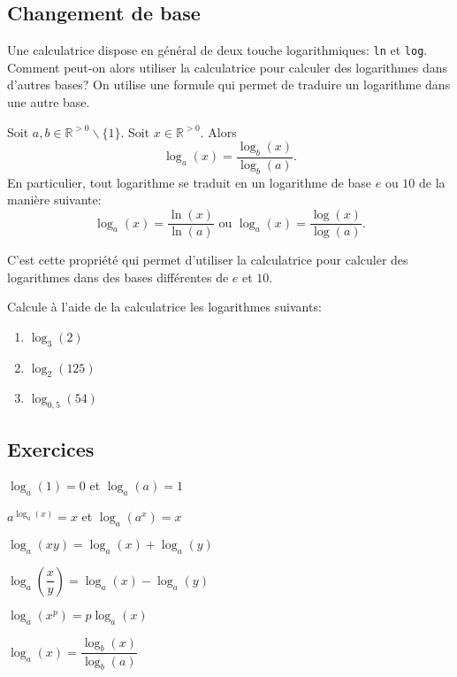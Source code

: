 \documentclass[a4paper,12pt,singlepage]{report}
\newcommand{\IR}{\mathbb{R}}
\begin{document}
\subsection{Changement de base}
\label{sec:org56df2ac}
Une calculatrice dispose en général de deux touche logarithmiques: \texttt{ln}
et \texttt{log}. Comment peut-on alors utiliser la calculatrice pour calculer
des logarithmes dans d'autres bases? On utilise une formule qui permet de
traduire un logarithme dans une autre base.
\begin{propriete}
Soit \(a,b\in\IR^{>0}\backslash\{1\}\). Soit \(x\in\IR^{>0}\). Alors
\[
\log_a(x)=\dfrac{\log_b(x)}{\log_b(a)}.
\]
En particulier, tout logarithme se traduit en un logarithme de base \(e\) ou \(10\)
de la manière suivante:
\[
\log_a(x)=\dfrac{\ln(x)}{\ln(a)}\text{ ou }\log_a(x)=\dfrac{\log(x)}{\log(a)}.
\]
\end{propriete}

C'est cette propriété qui permet d'utiliser la calculatrice pour calculer des
logarithmes dans des bases différentes de \(e\) et \(10\).

\begin{exemple}
Calcule à l'aide de la calculatrice les logarithmes suivants:
\begin{enumerate}
\item \(\log_3(2)\)
\vspace{2cm}

\item \(\log_2(125)\)
\vspace{2cm}

\item \(\log_{0,5}(54)\)
\vspace{2cm}
\end{enumerate}
\end{exemple}
\subsection{Exercices}
\label{sec:org9f72c6b}
\begin{boite}
\par \setlength{\columnseprule}{0 pt}
          \begin{minipage}[t]{\linewidth}
          \begin{multicols}{3}

\(\log_a(1)=0\) et \(\log_a(a)=1\)

\(a^{\log_a(x)}=x\) et \(\log_a(a^x)=x\)

\(\log_a(xy)=\log_a(x)+\log_a(y)\)

\(\log_a\left(\dfrac{x}{y}\right)=\log_a(x)-\log_a(y)\)

\(\log_a(x^p)=p\log_a(x)\)

\(\log_a(x)=\dfrac{\log_b(x)}{\log_b(a)}\)


\end{multicols}\end{minipage}
\end{boite}
\end{document}
